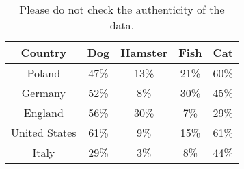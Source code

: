 \begin{table}[htbp]
\centering
\begin{tabular}{||c c c c c||} 
 \hline
 Country & Dog & Hamster & Fish & Cat \\ [0.5ex] 
 \hline\hline
 Poland & 47\% & 13\% & 21\% & 60\% \\ 
 \hline
 Germany & 52\% & 8\% & 30\% & 45\% \\
 \hline
 England & 56\% & 30\% & 7\% & 29\% \\
 \hline
 United States & 61\% & 9\% & 15\% & 61\% \\
 \hline
 Italy & 29\% & 3\% & 8\% & 44\% \\
 \hline
\end{tabular}
\label{tab:animals}
\caption{Please do not check the authenticity of the data.}
\end{table}